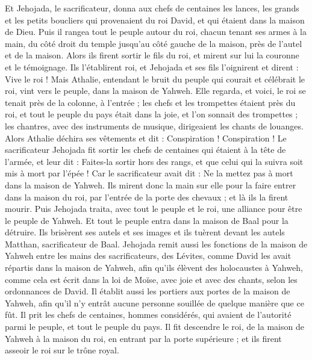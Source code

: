 \begin{multicols}{2}
Et Jehojada, le sacrificateur, donna aux chefs de centaines les lances, les grands et les petits boucliers qui provenaient du roi David, et qui étaient dans la maison de Dieu.
Puis il rangea tout le peuple autour du roi, chacun tenant ses armes à la main, du côté droit du temple jusqu'au côté gauche de la maison, près de l'autel et de la maison.
Alors ils firent sortir le fils du roi, et mirent sur lui la couronne et le témoignage. Ils l'établirent roi, et Jehojada et ses fils l'oignirent et dirent : Vive le roi !
Mais Athalie, entendant le bruit du peuple qui courait et célébrait le roi, vint vers le peuple, dans la maison de Yahweh.
Elle regarda, et voici, le roi se tenait près de la colonne, à l'entrée ; les chefs et les trompettes étaient près du roi, et tout le peuple du pays était dans la joie, et l'on sonnait des trompettes ; les chantres, avec des instruments de musique, dirigeaient les chants de louanges. Alors Athalie déchira ses vêtements et dit : Conspiration ! Conspiration !
Le sacrificateur Jehojada fit sortir les chefs de centaines qui étaient à la tête de l'armée, et leur dit : Faites-la sortir hors des rangs, et que celui qui la suivra soit mis à mort par l'épée ! Car le sacrificateur avait dit : Ne la mettez pas à mort dans la maison de Yahweh.
Ils mirent donc la main sur elle pour la faire entrer dans la maison du roi, par l'entrée de la porte des chevaux ; et là ils la firent mourir.
Puis Jehojada traita, avec tout le peuple et le roi, une alliance pour être le peuple de Yahweh.
Et tout le peuple entra dans la maison de Baal pour la détruire. Ils brisèrent ses autels et ses images et ils tuèrent devant les autels Matthan, sacrificateur de Baal.
Jehojada remit aussi les fonctions de la maison de Yahweh entre les mains des sacrificateurs, des Lévites, comme David les avait répartis dans la maison de Yahweh, afin qu'ils élèvent des holocaustes à Yahweh, comme cela est écrit dans la loi de Moïse, avec joie et avec des chants, selon les ordonnances de David.
Il établit aussi les portiers aux portes de la maison de Yahweh, afin qu'il n'y entrât aucune personne souillée de quelque manière que ce fût.
Il prit les chefs de centaines, hommes considérés, qui avaient de l'autorité parmi le peuple, et tout le peuple du pays. Il fit descendre le roi, de la maison de Yahweh à la maison du roi, en entrant par la porte supérieure ; et ils firent asseoir le roi sur le trône royal.

\end{multicols}
